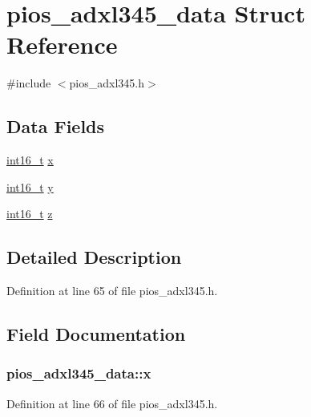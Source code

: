 \hypertarget{structpios__adxl345__data}{\section{pios\-\_\-adxl345\-\_\-data Struct Reference}
\label{structpios__adxl345__data}
}


{\ttfamily \#include $<$pios\-\_\-adxl345.\-h$>$}

\subsection*{Data Fields}
\begin{DoxyCompactItemize}
\item 
\hyperlink{stdint_8h_aa343fa3b3d06292b959ffdd4c4703b06}{int16\-\_\-t} \hyperlink{structpios__adxl345__data_ab1338ff20e167a7a38475401bc16616e}{x}
\item 
\hyperlink{stdint_8h_aa343fa3b3d06292b959ffdd4c4703b06}{int16\-\_\-t} \hyperlink{structpios__adxl345__data_a442839a6ffa895262a2a0924e6a5066a}{y}
\item 
\hyperlink{stdint_8h_aa343fa3b3d06292b959ffdd4c4703b06}{int16\-\_\-t} \hyperlink{structpios__adxl345__data_a5d428741b731802a2974ef2598fe1a4c}{z}
\end{DoxyCompactItemize}


\subsection{Detailed Description}


Definition at line 65 of file pios\-\_\-adxl345.\-h.



\subsection{Field Documentation}
\hypertarget{structpios__adxl345__data_ab1338ff20e167a7a38475401bc16616e}{
\subsubsection[{x}]{ pios\-\_\-adxl345\-\_\-data\-::x}}\label{structpios__adxl345__data_ab1338ff20e167a7a38475401bc16616e}


Definition at line 66 of file pios\-\_\-adxl345.\-h.

